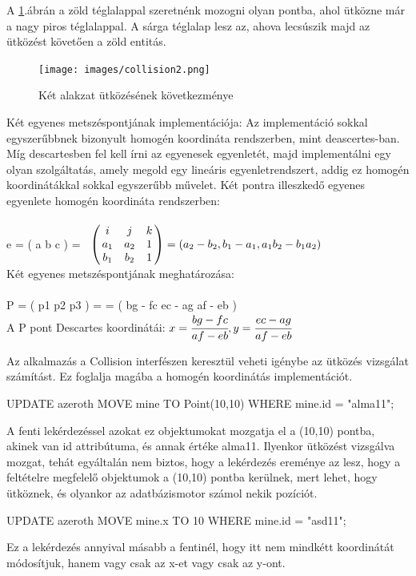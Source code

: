 \begin{sql}
A \ref{fig:collision2}.ábrán a zöld téglalappal szeretnénk mozogni olyan pontba, ahol ütközne már a nagy piros téglalappal. A sárga téglalap lesz az, ahova lecsúszik majd az ütközést követ\H oen a zöld entitás.

\begin{figure}[htb]
	\begin{center}
		\texttt{[image: images/collision2.png]}
		\caption{Két alakzat ütközésének következménye}
		\label{fig:collision2}
	\end{center}
\end{figure}

Két egyenes metszéspontjának implementációja: Az implementáció sokkal egyszer\H ubbnek bizonyult homogén koordináta rendszerben, mint deascertes-ban. Míg descartesben fel kell írni az egyenesek egyenletét, majd implementálni egy olyan szolgáltatás, amely megold egy lineáris egyenletrendszert, addig ez homogén koordinátákkal sokkal egyszer\H ubb m\H uvelet.
Két pontra illeszked\H o egyenes egyenlete homogén koordináta rendszerben: 
\\
e = ( a b c ) =$ \bordermatrix{~ &  &  &  \cr
	& i & j & k\cr
	& a_1 & a_2 & 1\cr
	& b_1 & b_2 & 1\cr} = ( a_2 - b_2 , b_1 - a_1 , a_1b_2 - b_1a_2 )$
\\
Két egyenes metszéspontjának meghatározása:\\
\\
P = ( p1 p2 p3 ) =  = ( bg - fc  ec - ag  af - eb )
\\
A P pont Descartes koordinátái:
$ x = \cfrac{bg - fc}{af - eb} , y = \cfrac{ec - ag}{af - eb}$
\cite{Banya5}


Az alkalmazás a Collision interfészen keresztül veheti igénybe az ütközés vizsgálat számítást. Ez foglalja magába a homogén koordinátás implementációt.

\begin{sql}
UPDATE azeroth MOVE  mine TO Point(10,10) WHERE mine.id = "alma11"; 
\end{sql}
A fenti lekérdezéssel azokat ez objektumokat mozgatja el a (10,10) pontba, akinek van id attribútuma, és annak értéke alma11. Ilyenkor ütközést vizsgálva mozgat, tehát egyáltalán nem biztos, hogy a lekérdezés ereménye az lesz, hogy a feltételre megfelelő objektumok a (10,10) pontba kerülnek, mert lehet, hogy ütköznek, és olyankor az adatbázismotor számol nekik pozíciót.
\begin{sql}
UPDATE azeroth MOVE  mine.x TO 10 WHERE mine.id = "asd11"; 
\end{sql}
Ez a lekérdezés annyival másabb a fentinél, hogy itt nem mindkétt koordinátát módosítjuk, hanem vagy csak az x-et vagy csak az y-ont.


\end{sql}
